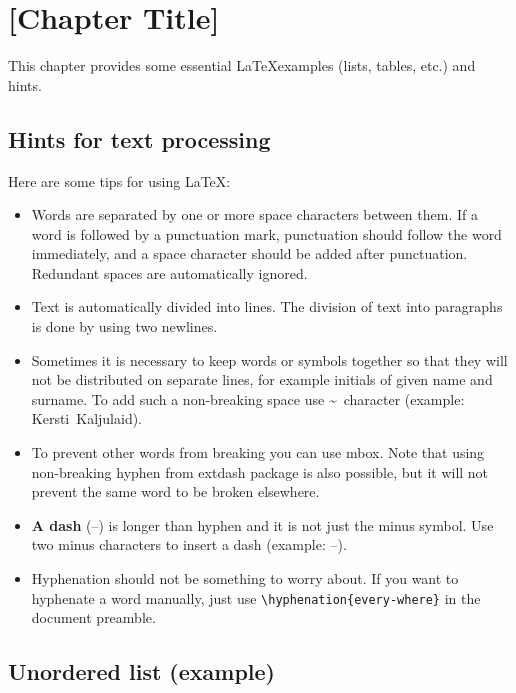 \section{[Chapter Title]}

This chapter provides some essential \LaTeX examples (lists, tables,
etc.) and hints.

\subsection{Hints for text processing}

Here are some tips for using \LaTeX:

\begin{itemize}
\item Words are separated by one or       more space characters between
  them. If a word is followed by a punctuation mark, punctuation should
  follow the word immediately, and a space character should be added
  after punctuation. Redundant
  spaces      are
  automatically             ignored.

\item Text is automatically divided into lines. The division of text
  into paragraphs is done by using two newlines.

\item Sometimes it is necessary to keep words or symbols together so
  that they will not be distributed on separate lines, for example
  initials of given name and surname. To add such a non-breaking space
  use \textasciitilde\ character (example: Kersti~Kaljulaid).

\item To prevent other words from breaking you can use mbox. Note
  that using \mbox{non-breaking} hyphen from extdash package is also
  possible, but it will not prevent the same word to be broken
  elsewhere.

\item \textbf{A dash} (--) is longer than hyphen and it is not just
  the minus symbol. Use two minus characters to insert a dash
  (example: --).

\item Hyphenation should not be something to worry about. If you want to hyphenate a
  word manually, just use \verb!\hyphenation{every-where}! in the document preamble.

\end{itemize}

\subsection{Unordered list (example)}

